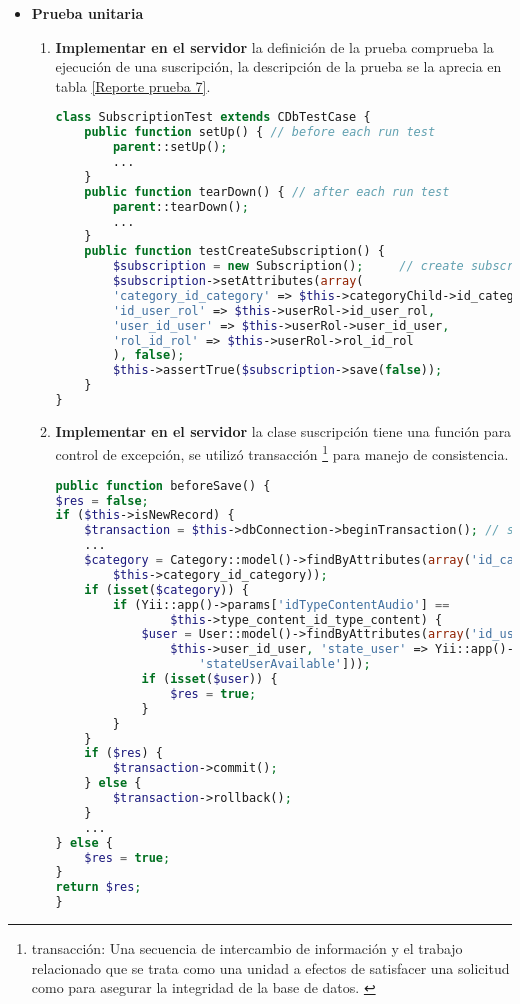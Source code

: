 \begin{itemize}

\item \textbf{Prueba unitaria}

\begin{enumerate}

\item \textbf{Implementar en el servidor} la definición de la prueba
 comprueba la ejecución de una
suscripción, la descripción de la prueba se la aprecia en 
tabla \ref{Reporte prueba 7}.

\begin{lstlisting}[language=PHP, caption={Prueba de ejecución para suscripción.}]
class SubscriptionTest extends CDbTestCase {
    public function setUp() { // before each run test
        parent::setUp();
        ...
    }
    public function tearDown() { // after each run test
        parent::tearDown();
        ...
    }
    public function testCreateSubscription() {
        $subscription = new Subscription();     // create subscription
        $subscription->setAttributes(array(
        'category_id_category' => $this->categoryChild->id_category,
        'id_user_rol' => $this->userRol->id_user_rol,
        'user_id_user' => $this->userRol->user_id_user,
        'rol_id_rol' => $this->userRol->rol_id_rol
        ), false);
        $this->assertTrue($subscription->save(false));
    }
}
\end{lstlisting}

\item \textbf{Implementar en el servidor} la clase suscripción tiene una
función para control de excepción, se utilizó transacción \footnote{transacción:
Una secuencia de intercambio de información y el trabajo relacionado que se
trata como una unidad a efectos de satisfacer una solicitud como para
asegurar la integridad de la base de datos. \cite{transaction}} para manejo
de consistencia.

\begin{lstlisting}[language=PHP, caption={Función callback para control dependencia.}]
public function beforeSave() {
$res = false;
if ($this->isNewRecord) {
    $transaction = $this->dbConnection->beginTransaction(); // start transaction
    ...
    $category = Category::model()->findByAttributes(array('id_category' => 
        $this->category_id_category));
    if (isset($category)) {
        if (Yii::app()->params['idTypeContentAudio'] == 
                $this->type_content_id_type_content) {
            $user = User::model()->findByAttributes(array('id_user' => 
                $this->user_id_user, 'state_user' => Yii::app()->params[
                    'stateUserAvailable']));
            if (isset($user)) {
                $res = true;
            }
        }
    }
    if ($res) {
        $transaction->commit();
    } else {
        $transaction->rollback();
    }
    ...
} else {
    $res = true;
}
return $res;
}
\end{lstlisting}


\end{enumerate}
\end{itemize}
